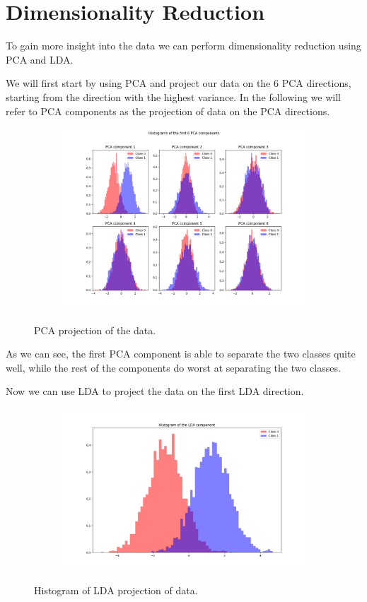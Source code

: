 \documentclass[12pt]{report}
\newcommand{\nnl}{%
    \newline
    \newline
}
\begin{document}
\chapter{Dimensionality Reduction}
To gain more insight into the data we can perform dimensionality reduction using PCA and LDA.
\nnl
We will first start by using PCA and project our data on the 6 PCA directions, starting from the direction with the highest variance.
In the following we will refer to PCA components as the projection of data on the PCA directions.
\begin{figure}[H]
    \centering
    \begin{subfigure}[t]{1\textwidth}
        \includegraphics[width=\textwidth]{./plot/dim_red/PCA.png}
    \end{subfigure}
    \caption{PCA projection of the data.}
    \label{fig:PCA}
\end{figure}
\noindent
As we can see, the first PCA component is able to separate the two classes quite well, while the rest of the components do worst at separating the two classes.
\nnl
Now we can use LDA to project the data on the first LDA direction.
\begin{figure}[H]
    \centering
    \begin{subfigure}[t]{0.6\textwidth}
        \includegraphics[width=\textwidth]{./plot/dim_red/LDA.png}
    \end{subfigure}
    \caption{Histogram of LDA projection of data.}
    \label{fig:LDA}
\end{figure}
\end{document}
